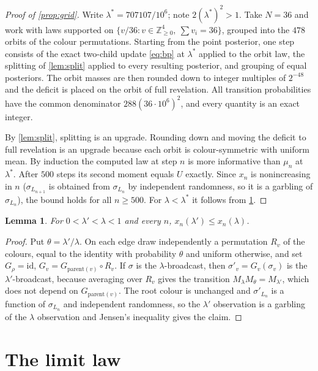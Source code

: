 \documentclass[11pt]{amsart}
\newtheorem{lemma}[theorem]{Lemma}
\theoremstyle{definition}
\theoremstyle{remark}
\begin{document}
\begin{proof}[Proof of \cref{prop:grid}]
Write $\lambda^*=707107/10^6$; note $2(\lambda^*)^2>1$. Take $N=36$ and work with laws supported on
$\{v/36:v\in\mathbb Z_{\ge0}^4,\ \sum v_i=36\}$, grouped into the $478$ orbits of the colour
permutations. Starting from the point posterior, one step consists of the exact two-child update
\eqref{eq:bp} at $\lambda^*$ applied to the orbit law, the splitting of \cref{lem:split} applied to
every resulting posterior, and grouping of equal posteriors. The orbit masses are then rounded down to
integer multiples of $2^{-48}$ and the deficit is placed on the orbit of full revelation. All
transition probabilities have the common denominator $288(36\cdot10^6)^2$, and every quantity is an
exact integer.

By \cref{lem:split}, splitting is an upgrade. Rounding down and moving the deficit to full revelation
is an upgrade because each orbit is colour-symmetric with uniform mean. By induction the computed law
at step $n$ is more informative than $\mu_n$ at $\lambda^*$. After $500$ steps its second moment equals
$U$ exactly. Since $x_n$ is nonincreasing in $n$ ($\sigma_{L_{n+1}}$ is obtained from $\sigma_{L_n}$ by
independent randomness, so it is a garbling of $\sigma_{L_n}$), the bound holds for all $n\ge500$. For $\lambda<\lambda^*$ it follows from
\cref{lem:garble}.
\end{proof}

\begin{lemma}\label{lem:garble}
For $0<\lambda'<\lambda<1$ and every $n$, $x_n(\lambda')\le x_n(\lambda)$.
\end{lemma}

\begin{proof}
Put $\theta=\lambda'/\lambda$. On each edge draw independently a permutation $R_v$ of the colours,
equal to the identity with probability $\theta$ and uniform otherwise, and set $G_\rho=\mathrm{id}$,
$G_v=G_{\mathrm{parent}(v)}\circ R_v$. If $\sigma$ is the $\lambda$-broadcast, then $\sigma'_v=G_v(\sigma_v)$
is the $\lambda'$-broadcast, because averaging over $R_v$ gives the transition
$M_\lambda M_\theta=M_{\lambda'}$, which does not depend on $G_{\mathrm{parent}(v)}$. The root colour
is unchanged and $\sigma'_{L_n}$ is a function of $\sigma_{L_n}$ and independent randomness, so the
$\lambda'$ observation is a garbling of the $\lambda$ observation and Jensen's inequality gives the
claim.
\end{proof}

\section{The limit law}\label{sec:limit}
\end{document}
